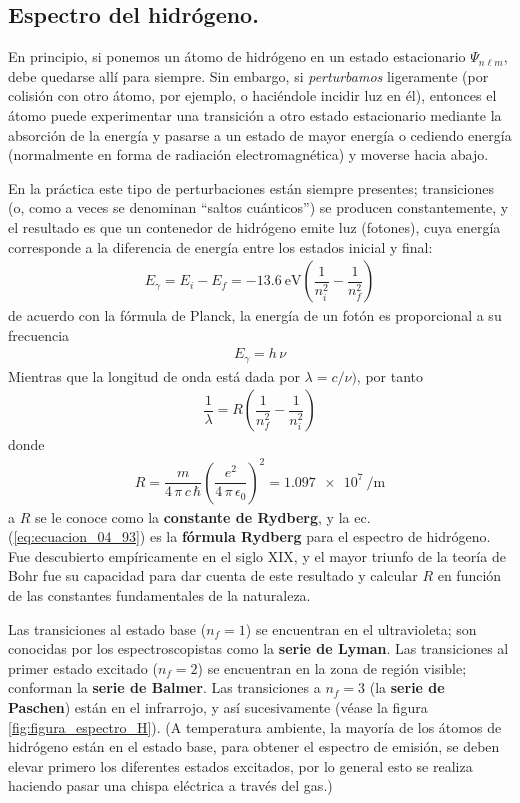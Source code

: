 \subsection{Espectro del hidrógeno.}
En principio, si ponemos un átomo de hidrógeno en un estado estacionario $\Psi_{n \ell m}$, debe quedarse allí para siempre. Sin embargo, si \emph{perturbamos} ligeramente (por colisión con otro átomo, por ejemplo, o haciéndole incidir  luz en él), entonces el átomo puede experimentar una transición a otro estado estacionario mediante la absorción de la energía y pasarse a un estado de mayor energía o cediendo energía (normalmente en forma de radiación electromagnética) y moverse  hacia abajo.
\par
En la práctica este tipo de perturbaciones están siempre presentes; transiciones (o, como a veces se denominan \enquote{saltos cuánticos}) se producen constantemente, y el resultado es que un contenedor de hidrógeno emite luz (fotones), cuya energía corresponde a la diferencia de energía entre los estados inicial y final:
\begin{align}
E_{\gamma} = E_{i} - E_{f} = \SI{-13.6}{\electronvolt} \left( \dfrac{1}{n_{i}^{2}} - \dfrac{1}{n_{f}^{2}} \right)
\label{eq:ecuacion_04_91}
\end{align}
de acuerdo con la fórmula de Planck, la energía de un fotón es proporcional a su frecuencia
\begin{align}
E_{\gamma} = h \, \nu
\label{eq:ecuacion_04_92}
\end{align}
Mientras que la longitud de onda está dada por $\lambda = c / \nu)$, por tanto
\begin{align}
\dfrac{1}{\lambda} = R \left( \dfrac{1}{n_{f}^{2}} - \dfrac{1}{n_{i}^{2}} \right)
\label{eq:ecuacion_04_93}
\end{align}
donde
\begin{align}
R = \dfrac{m}{4 \, \pi \, c \, \hbar} \left( \dfrac{e^{2}}{4 \, \pi \, \epsilon_{0}} \right)^{2} = \SI{1.097e7}{\per\metre}
\label{eq:ecuacion_04_94}
\end{align}
a $R$ se le conoce como la \textbf{constante de Rydberg}, y la ec. (\ref{eq:ecuacion_04_93}) es la \textbf{fórmula Rydberg} para el espectro de hidrógeno. Fue descubierto empíricamente en el siglo XIX, y el mayor triunfo de la teoría de Bohr fue su capacidad para dar cuenta de este resultado y calcular $R$ en función de las constantes fundamentales de la naturaleza.
\par
Las transiciones al estado base ($n_{f}= 1$) se encuentran en el ultravioleta; son conocidas por los espectroscopistas como la \textbf{serie de Lyman}. Las transiciones al primer estado excitado ($n_{f}= 2$) se encuentran en la zona de región visible; conforman la \textbf{serie de Balmer}. Las transiciones a $n_{f} = 3$ (la \textbf{serie de Paschen}) están en el infrarrojo, y así sucesivamente (véase la figura \ref{fig:figura_espectro_H}). (A temperatura ambiente, la mayoría de los átomos de hidrógeno están en el estado base, para obtener el espectro de emisión, se deben elevar primero los diferentes estados excitados, por lo general esto se realiza haciendo pasar una chispa eléctrica a través del gas.)
